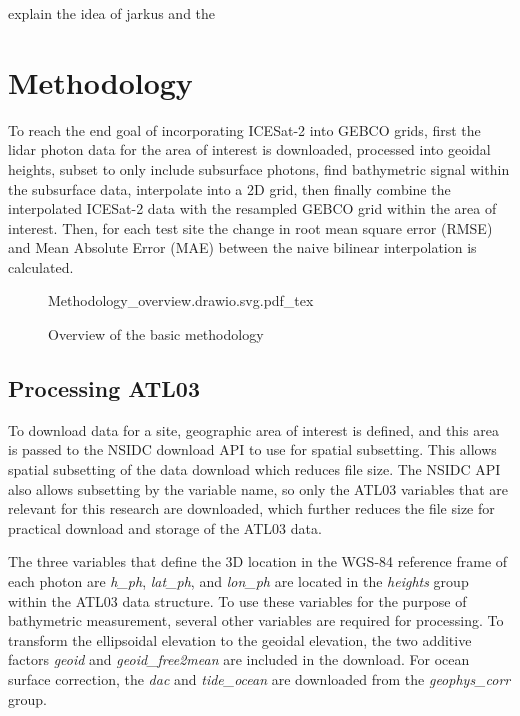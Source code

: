 explain the idea of jarkus and the 
\section{Methodology}

To reach the end goal of incorporating ICESat-2 into GEBCO grids, first the lidar photon data for the area of interest is downloaded, processed into geoidal heights, subset to only include subsurface photons, find bathymetric signal within the subsurface data, interpolate into a 2D grid, then finally combine the interpolated ICESat-2 data with the resampled GEBCO grid within the area of interest. Then, for each test site the change in root mean square error (RMSE) and Mean Absolute Error (MAE)  between the naive bilinear interpolation is calculated. 

\begin{figure}[h]
    \centering
    {Methodology_overview.drawio.svg.pdf_tex}
    \caption{Overview of the basic methodology}
    \label{fig:methodology-overview}
\end{figure}

\subsection{Processing ATL03}
To download data for a site, geographic area of interest is defined, and this area is passed to the NSIDC download API to use for spatial subsetting. This allows spatial subsetting of the data download which reduces file size. The NSIDC API also allows subsetting by the variable name, so only the ATL03 variables that are relevant for this research are downloaded, which further reduces the file size for practical download and storage of the ATL03 data. 

The three variables that define the 3D location in the WGS-84 reference frame of each photon are \emph{h\_ph}, \emph{lat\_ph}, and \emph{lon\_ph} are located in the \emph{heights} group within the ATL03 data structure. To use these variables for the purpose of bathymetric measurement, several other variables are required for processing. To transform the ellipsoidal elevation to the geoidal elevation, the two additive factors \emph{geoid} and \emph{geoid\_free2mean} are included in the download. For ocean surface correction, the \emph{dac} and \emph{tide\_ocean} are downloaded from the \emph{geophys\_corr} group.

